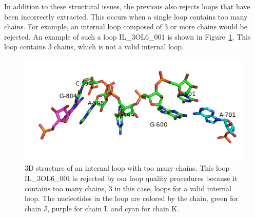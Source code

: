 
In addition to these structural issues, the previous also rejects loops that
have been incorrectly extracted. This occurs when a single loop contains too
many chains. For example, an internal loop composed of 3 or more chains would be
rejected. An example of such a loop IL\_3OL6\_001 is shown in
Figure~\ref{fig:too-many-chains}. This loop contains 3 chains, which is not a
valid internal loop.

\begin{figure}
  \includegraphics[width=\textwidth]{chapter-5/figs/loops/IL-3OL6-001}
  \caption{3D structure of an internal loop with too many chains. This loop
    IL\_3OL6\_001 is rejected by our loop quality procedures because it contains
    too many chains, 3 in this case, loops for a valid internal loop. The
  nucleotides in the loop are colored by the chain, green for chain J, purple
for chain L and cyan for chain K.}
  \label{fig:too-many-chains}
\end{figure}

